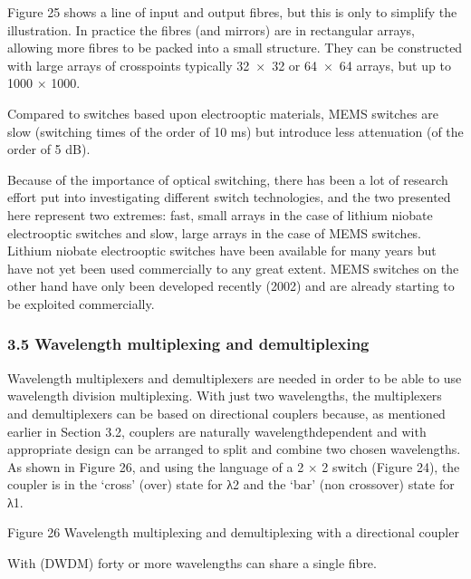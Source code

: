 \documentclass[letterpaper,10pt,english]{sphinxmanual}
\let\sphinxpxdimen\pdfpxdimen\else\newdimen\sphinxpxdimen
\begin{document}
Figure 25 shows a line of input and output fibres, but this is only to simplify the illustration. In practice the fibres (and mirrors) are in rectangular arrays, allowing more fibres to be packed into a small structure. They can be constructed with large arrays of crosspoints \textendash{} typically 32 × 32 or 64 × 64 arrays, but up to 1000 × 1000.

Compared to switches based upon electro\sphinxhyphen{}optic materials, MEMS switches are slow (switching times of the order of 10 ms) but introduce less attenuation (of the order of 5 dB).

Because of the importance of optical switching, there has been a lot of research effort put into investigating different switch technologies, and the two presented here represent two extremes: fast, small arrays in the case of lithium niobate electro\sphinxhyphen{}optic switches and slow, large arrays in the case of MEMS switches. Lithium niobate electro\sphinxhyphen{}optic switches have been available for many years but have not yet been used commercially to any great extent. MEMS switches on the other hand have only been
developed recently (2002) and are already starting to be exploited commercially.


\subsubsection{3.5 Wavelength multiplexing and demultiplexing}
\label{\detokenize{content/session_00/Part_00_03:3.5-Wavelength-multiplexing-and-demultiplexing}}
Wavelength multiplexers and demultiplexers are needed in order to be able to use wavelength division multiplexing. With just two wavelengths, the multiplexers and demultiplexers can be based on directional couplers because, as mentioned earlier in Section 3.2, couplers are naturally wavelength\sphinxhyphen{}dependent and with appropriate design can be arranged to split and combine two chosen wavelengths. As shown in Figure 26, and using the language of a 2 × 2 switch (Figure 24), the coupler is in the ‘cross’
(over) state for λ2 and the ‘bar’ (non cross\sphinxhyphen{}over) state for λ1.

\sphinxincludegraphics[width=511\sphinxpxdimen,height=234\sphinxpxdimen]{{t305_025i}.jpg}

Figure 26 Wavelength multiplexing and demultiplexing with a directional coupler

With  (DWDM) forty or more wavelengths can share a single fibre.
\end{document}
